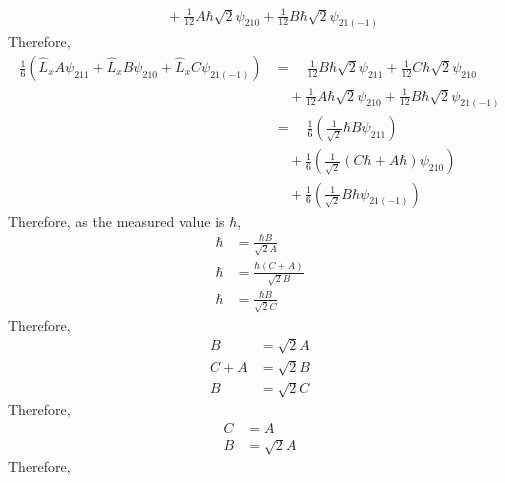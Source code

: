 \documentclass[fleqn, a4paper, 11pt, oneside]{amsart}
\theoremstyle{definition}
\theoremstyle{theorem}
\begin{document}
\begin{solution}
\begin{enumerate}[leftmargin=*]
\begin{align*}
                                               & \quad + \frac{1}{12} A \hbar \sqrt{2} \psi_{2 1 0} + \frac{1}{12} B \hbar \sqrt{2} \psi_{2 1 (-1)}
			\end{align*}
			Therefore,
			\begin{align*}
				\frac{1}{6} \left( \hat{L}_x A \psi_{2 1 1} + \hat{L}_x B \psi_{2 1 0} + \hat{L}_x C \psi_{2 1 (-1)} \right) & = \quad \frac{1}{12} B \hbar \sqrt{2} \psi_{2 1 1} + \frac{1}{12} C \hbar \sqrt{2} \psi_{2 1 0}    \\
                                                                                                                                             & \quad + \frac{1}{12} A \hbar \sqrt{2} \psi_{2 1 0} + \frac{1}{12} B \hbar \sqrt{2} \psi_{2 1 (-1)} \\
                                                                                                                                             & = \quad \frac{1}{6} \left( \frac{1}{\sqrt{2}} \hbar B \psi_{2 1 1} \right)                         \\
                                                                                                                                             & \quad + \frac{1}{6} \left( \frac{1}{\sqrt{2}} (C \hbar + A \hbar) \psi_{2 1 0} \right)             \\
                                                                                                                                             & \quad + \frac{1}{6} \left( \frac{1}{\sqrt{2}} B \hbar \psi_{2 1 (-1)} \right)
			\end{align*}
			Therefore, as the measured value is $\hbar$,
			\begin{align*}
				\hbar & = \frac{\hbar B}{\sqrt{2} A}       \\
				\hbar & = \frac{\hbar (C + A)}{\sqrt{2} B} \\
				\hbar & = \frac{\hbar B}{\sqrt{2} C}
			\end{align*}
			Therefore,
			\begin{align*}
				B     & = \sqrt{2} A \\
				C + A & = \sqrt{2} B \\
				B     & = \sqrt{2} C
			\end{align*}
			Therefore,
			\begin{align*}
				C & = A \\
				B & = \sqrt{2} A
			\end{align*}
			Therefore,
			\begin{align*}

\end{align*}
\end{enumerate}
\end{solution}
\end{document}
